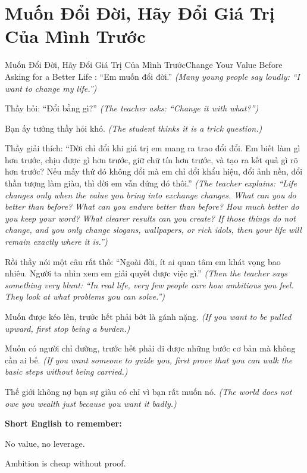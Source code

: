 \section{Muốn Đổi Đời, Hãy Đổi Giá Trị Của Mình Trước}
\begin{truyen}{Muốn Đổi Đời, Hãy Đổi Giá Trị Của Mình Trước}{Change Your Value Before Asking for a Better Life}
: ``Em muốn đổi đời.''
\textit{(Many young people say loudly: ``I want to change my life.'')}

Thầy hỏi: ``Đổi bằng gì?''
\textit{(The teacher asks: ``Change it with what?'')}

Bạn ấy tưởng thầy hỏi khó.
\textit{(The student thinks it is a trick question.)}

Thầy giải thích: ``Đời chỉ đổi khi giá trị em mang ra trao đổi đổi. Em biết làm gì hơn trước, chịu được gì hơn trước, giữ chữ tín hơn trước, và tạo ra kết quả gì rõ hơn trước? Nếu mấy thứ đó không đổi mà em chỉ đổi khẩu hiệu, đổi ảnh nền, đổi thần tượng làm giàu, thì đời em vẫn đứng đó thôi.''
\textit{(The teacher explains: ``Life changes only when the value you bring into exchange changes. What can you do better than before? What can you endure better than before? How much better do you keep your word? What clearer results can you create? If those things do not change, and you only change slogans, wallpapers, or rich idols, then your life will remain exactly where it is.'')}

Rồi thầy nói một câu rất thô: ``Ngoài đời, ít ai quan tâm em khát vọng bao nhiêu. Người ta nhìn xem em giải quyết được việc gì.''
\textit{(Then the teacher says something very blunt: ``In real life, very few people care how ambitious you feel. They look at what problems you can solve.'')}
\end{truyen}

\begin{baihoc}
Muốn được kéo lên, trước hết phải bớt là gánh nặng.
\textit{(If you want to be pulled upward, first stop being a burden.)}

Muốn có người chỉ đường, trước hết phải đi được những bước cơ bản mà không cần ai bế.
\textit{(If you want someone to guide you, first prove that you can walk the basic steps without being carried.)}

Thế giới không nợ bạn sự giàu có chỉ vì bạn rất muốn nó.
\textit{(The world does not owe you wealth just because you want it badly.)}
\end{baihoc}

\begin{ghinhoanh}
\textbf{Short English to remember:}

No value, no leverage.

Ambition is cheap without proof.
\end{ghinhoanh}

